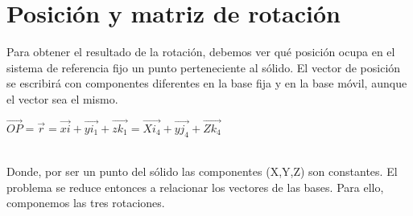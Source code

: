 \documentclass[12pt,a4paper]{report}
\begin{document}
\section{Posición y matriz de rotación}
Para obtener el resultado de la rotación, debemos ver qué posición ocupa en el sistema de referencia fijo un punto perteneciente al sólido. El vector de posición se escribirá con componentes diferentes en la base fija y en la base móvil, aunque el vector sea el mismo.\\
\begin{center}
$\overrightarrow{OP}=\overrightarrow{r}=\overrightarrow{xi}+\overrightarrow{yi_{1}}+\overrightarrow{zk_{1}}=\overrightarrow{Xi_{4}}+\overrightarrow{yj_{4}}+\overrightarrow{Zk_{4}}$
\end{center}
\noindent\\
Donde, por ser un punto del sólido las componentes (X,Y,Z) son constantes. El problema se reduce entonces a relacionar los vectores de las bases. Para ello, componemos las tres rotaciones.\\
\end{document}
